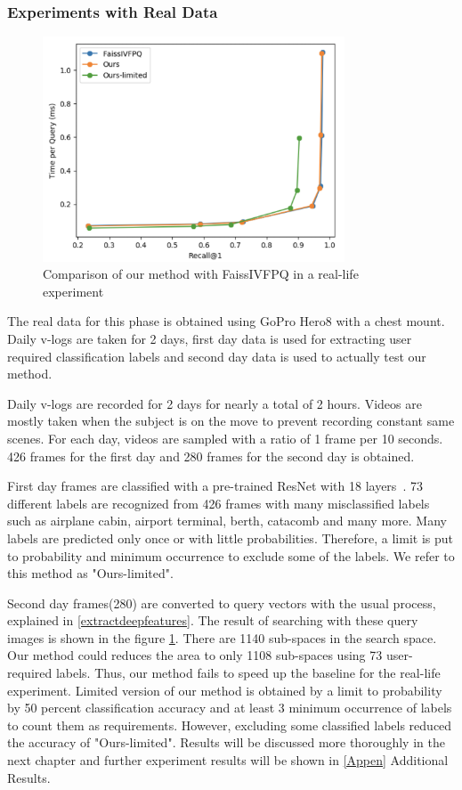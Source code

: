 \subsubsection*{Experiments with Real Data}

\begin{figure}
    \centering
    \includegraphics[width=0.8\textwidth]{thesis/images/real_data_experiment.png}
    \caption{Comparison of our method with FaissIVFPQ in a real-life experiment}
    \label{fig:realdataexp}
\end{figure}

The real data for this phase is obtained using GoPro Hero8 with a chest mount. 
Daily v-logs are taken for 2 days, first day data is used for extracting user required classification labels and second day data is used to actually test our method.

Daily v-logs are recorded for 2 days for nearly a total of 2 hours. 
Videos are mostly taken when the subject is on the move to prevent recording constant same scenes.
For each day, videos are sampled with a ratio of 1 frame per 10 seconds. 
426 frames for the first day and 280 frames for the second day is obtained.

First day frames are classified with a pre-trained ResNet with 18 layers~\cite{resnet}. 
73 different labels are recognized from 426 frames with many misclassified labels such as airplane cabin, airport terminal, berth, catacomb and many more. 
Many labels are predicted only once or with little probabilities. Therefore, a limit is put to probability and minimum occurrence to exclude some of the labels. 
We refer to this method as "Ours-limited".

Second day frames(280) are converted to query vectors with the usual process, explained in \ref{extractdeepfeatures}. The result of searching with these query images is shown in the figure \ref{fig:realdataexp}. 
There are 1140 sub-spaces in the search space. Our method could reduces the area to only 1108 sub-spaces using 73 user-required labels. 
Thus, our method fails to speed up the baseline for the real-life experiment. 
Limited version of our method is obtained by a limit to probability by 50 percent classification accuracy and at least 3 minimum occurrence of labels to count them as requirements.
However, excluding some classified labels reduced the accuracy of "Ours-limited".
Results will be discussed more thoroughly in the next chapter and further experiment results will be shown in \ref{Appen} Additional Results.

